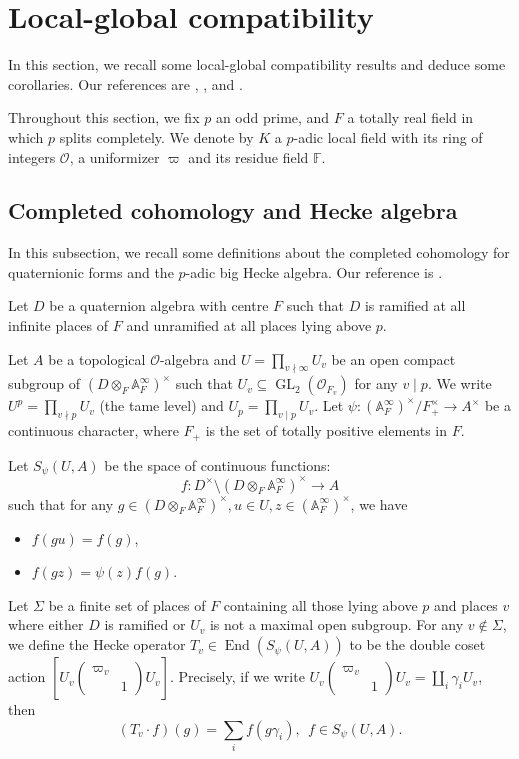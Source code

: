 \documentclass[a4paper, 12pt]{amsart}
\newcommand{\F}{\mathbb{F}}
\newcommand{\A}{\mathbb{A}}
\newcommand{\cO}{\mathcal{O}}
\newcommand{\DAi}{(D\otimes_F \A_F^\infty)^\times}
\newcommand{\AFi}{(\A_F^\infty)^\times}
\begin{document}
	\section{Local-global compatibility}
	
	In this section, we recall some local-global compatibility results and deduce some corollaries. Our references are \cite{Pa_k_nas_2013}, \cite{Paskunas_2021}, \cite{Pa_k_nas_2021} and \cite{pan2022fontaine}.
	
	Throughout this section, we fix $p$ an odd prime, and $F$ a totally real field in which $p$ splits completely. We denote by $K$  a $p$-adic local field with its ring of integers $\cO$, a uniformizer $\varpi$ and its residue field $\F$.
	
	\subsection{Completed cohomology and Hecke algebra}\label{sec for T}
	In this subsection, we recall some definitions about the completed cohomology for quaternionic forms and the $p$-adic big Hecke algebra. Our reference is \cite[Section 3]{pan2022fontaine}.
	
	Let $D$ be a quaternion algebra with centre $F$ such that $D$ is ramified at all infinite places of $F$ and unramified at all places lying above $p$. 
	
	Let $A$ be a topological $\cO$-algebra and $U = \prod_{v \nmid \infty} U_v$ be an open compact subgroup of $(D \otimes_F \mathbb{A}_F^\infty)^\times$ such that $U_v \subseteq \operatorname{GL}_2(\cO_{F_v})$ for any $v \mid p$. We write $U^p= \prod_{v \nmid p} U_v$ (the tame level) and $U_p =\prod_{v \mid p} U_v$. Let $\psi: (\mathbb{A}_F^\infty)^\times/F_+^\times \to A^\times$ be a continuous character, where $F_+$ is the set of totally positive elements in $F$.
	
    Let $S_{\psi}(U,A)$ be the space of continuous functions:
    \[f:D^{\times}\setminus \DAi\to A\]
    such that for any $g\in \DAi,u\in U,z\in \AFi$, we have
    \begin{itemize}
    	\item $f(gu)=f(g)$,
    	\item $f(gz)=\psi(z)f(g)$.
    \end{itemize}
    
     Let $\Sigma$ be a finite set of places of $F$ containing all those lying above $p$ and places $v$ where either $D$ is ramified or $U_v$ is not a maximal open subgroup. For any $v \notin \Sigma$, we define the Hecke operator $T_v \in \operatorname{End}(S_{\psi}(U,A))$ to be the double coset action $[U_v \begin{pmatrix}
    	\varpi_v & ~\\
    	~ & 1
    \end{pmatrix}U_v]$. Precisely, if we write $U_v \begin{pmatrix}
    	\varpi_v & ~\\
    	~ & 1
    \end{pmatrix}U_v  = \coprod_i \gamma_i U_v $, then $$
    (T_v \cdot f) (g) = \sum_i f(g\gamma_i), ~~f \in S_{\psi}(U,A). $$
    
\end{document}
